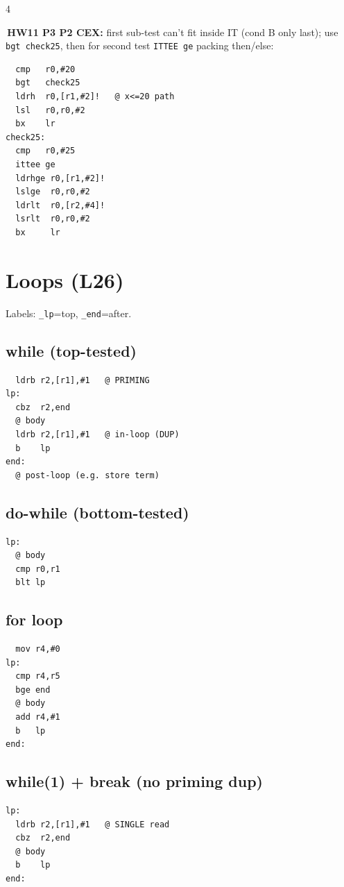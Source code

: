 \documentclass[8pt,landscape]{extarticle}
\newcommand{\asm}[1]{\texttt{\scriptsize #1}}
\newenvironment{ex}
  {\par\smallskip\noindent{\scriptsize\color{red!55!black}\textbf{Ex.}}\,\scriptsize\ignorespaces}
  {\par}
\begin{document}
\begin{multicols*}{4}
\begin{ex}\textbf{HW11 P3 P2 CEX:} first sub-test can't fit inside IT (cond B only last); use \asm{bgt check25}, then for second test \asm{ITTEE ge} packing then/else:
\begin{lstlisting}
  cmp   r0,#20
  bgt   check25
  ldrh  r0,[r1,#2]!   @ x<=20 path
  lsl   r0,r0,#2
  bx    lr
check25:
  cmp   r0,#25
  ittee ge
  ldrhge r0,[r1,#2]!
  lslge  r0,r0,#2
  ldrlt  r0,[r2,#4]!
  lsrlt  r0,r0,#2
  bx     lr
\end{lstlisting}\end{ex}

\section{Loops (L26)}

Labels: \texttt{\_lp}=top, \texttt{\_end}=after.

\subsection{while (top-tested)}
\begin{lstlisting}
  ldrb r2,[r1],#1   @ PRIMING
lp:
  cbz  r2,end
  @ body
  ldrb r2,[r1],#1   @ in-loop (DUP)
  b    lp
end:
  @ post-loop (e.g. store term)
\end{lstlisting}

\subsection{do-while (bottom-tested)}
\begin{lstlisting}
lp:
  @ body
  cmp r0,r1
  blt lp
\end{lstlisting}

\subsection{for loop}
\begin{lstlisting}
  mov r4,#0
lp:
  cmp r4,r5
  bge end
  @ body
  add r4,#1
  b   lp
end:
\end{lstlisting}

\subsection{while(1) + break (no priming dup)}
\begin{lstlisting}
lp:
  ldrb r2,[r1],#1   @ SINGLE read
  cbz  r2,end
  @ body
  b    lp
end:
\end{lstlisting}


\end{multicols*}
\end{document}

